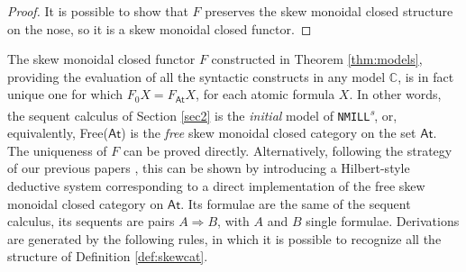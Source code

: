\documentclass[submission,copyright,creativecommons]{eptcs}
\theoremstyle{definition}
\newtheorem{defn}{Definition}[section]
\newcommand{\NMILL}{\texttt{NMILL}}
\newcommand{\SkNMILL}{\NMILL\textsuperscript{\textit{s}}}
\newcommand{\FSkMCC}{\textsf{Free}}
\begin{document}
\begin{proof}
It is possible to show that $F$ preserves the skew monoidal closed structure on the nose, so it is a skew monoidal closed functor.
\end{proof}

The skew monoidal closed functor $F$ constructed in Theorem \ref{thm:models}, providing the evaluation of all the syntactic constructs in any model $\mathbb{C}$, is in fact unique one for which $F_0 X = F_{\mathsf{At}} X$, for each atomic formula $X$. In other words, the
sequent calculus of Section \ref{sec2} is the \emph{initial} model of \SkNMILL, or, equivalently, \FSkMCC($\mathsf{At}$) is the \emph{free} skew
monoidal closed category on the set $\mathsf{At}$. The uniqueness of $F$ can be proved directly.  Alternatively, following the strategy of our previous papers \cite{}, this can be shown by introducing a Hilbert-style deductive system corresponding to a direct implementation of the free skew monoidal closed category on $\mathsf{At}$. Its formulae are the same of the sequent calculus, its sequents are pairs $A \Longrightarrow B$, with $A$ and $B$ single formulae. Derivations are generated by the following rules, in which it is possible to  recognize all the structure of Definition \ref{def:skewcat}.
\end{document}
